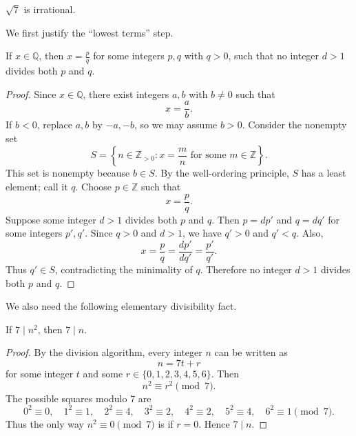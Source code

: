 \begin{theorem}
$\sqrt{7}$ is irrational.
\end{theorem}

We first justify the ``lowest terms'' step.

\begin{lemma}\label{lem:lowest-terms}
If $x\in \mathbb{Q}$, then $x=\frac{p}{q}$ for some integers $p,q$ with $q>0$, such that no integer $d>1$ divides both $p$ and $q$.
\end{lemma}

\begin{proof}
Since $x\in \mathbb{Q}$, there exist integers $a,b$ with $b\neq 0$ such that
\[
x=\frac{a}{b}.
\]
If $b<0$, replace $a,b$ by $-a,-b$, so we may assume $b>0$. Consider the nonempty set
\[
S=\left\{n\in \mathbb{Z}_{>0} : x=\frac{m}{n}\text{ for some }m\in \mathbb{Z}\right\}.
\]
This set is nonempty because $b\in S$. By the well-ordering principle, $S$ has a least element; call it $q$. Choose $p\in \mathbb{Z}$ such that
\[
x=\frac{p}{q}.
\]
Suppose some integer $d>1$ divides both $p$ and $q$. Then $p=dp'$ and $q=dq'$ for some integers $p',q'$. Since $q>0$ and $d>1$, we have $q'>0$ and $q'<q$. Also,
\[
x=\frac{p}{q}=\frac{dp'}{dq'}=\frac{p'}{q'}.
\]
Thus $q'\in S$, contradicting the minimality of $q$. Therefore no integer $d>1$ divides both $p$ and $q$.
\end{proof}

We also need the following elementary divisibility fact.

\begin{lemma}\label{lem:7-divides-square}
If $7\mid n^2$, then $7\mid n$.
\end{lemma}

\begin{proof}
By the division algorithm, every integer $n$ can be written as
\[
n=7t+r
\]
for some integer $t$ and some $r\in \{0,1,2,3,4,5,6\}$. Then
\[
n^2 \equiv r^2 \pmod{7}.
\]
The possible squares modulo $7$ are
\[
0^2\equiv 0,\quad
1^2\equiv 1,\quad
2^2\equiv 4,\quad
3^2\equiv 2,\quad
4^2\equiv 2,\quad
5^2\equiv 4,\quad
6^2\equiv 1
\pmod{7}.
\]
Thus the only way $n^2\equiv 0\pmod{7}$ is if $r=0$. Hence $7\mid n$.
\end{proof}

